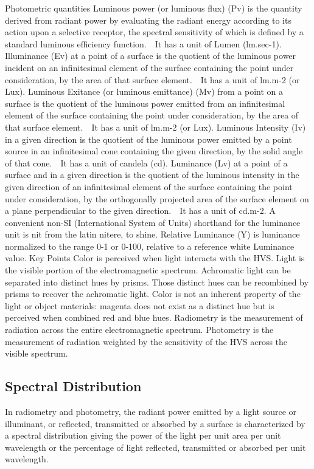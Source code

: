 Photometric quantities
Luminous power (or luminous flux) (Pv) is the quantity derived from radiant power by evaluating the radiant energy according to its action upon a selective receptor, the spectral sensitivity of which is defined by a standard luminous efficiency function.   It has a unit of Lumen (lm.sec-1).
Illuminance (Ev) at a point of a surface is the quotient of the luminous power incident on an infinitesimal element of the surface containing the point under consideration, by the area of that surface element.   It has a unit of lm.m-2 (or Lux).
Luminous Exitance (or luminous emittance) (Mv) from a point on a surface is the quotient of the luminous power emitted from an infinitesimal element of the surface containing the point under consideration, by the area of that surface element.   It has a unit of lm.m-2 (or Lux).
Luminous Intensity (Iv) in a given direction is the quotient of the luminous power emitted by a point source in an infinitesimal cone containing the given direction, by the solid angle of that cone.   It has a unit of candela (cd).
Luminance (Lv) at a point of a surface and in a given direction is the quotient of the luminous intensity in the given direction of an infinitesimal element of the surface containing the point under consideration, by the orthogonally projected area of the surface element on a plane perpendicular to the given direction.   It has a unit of cd.m-2. A convenient non-SI (International System of Units) shorthand for the luminance unit is nit from the latin nitere, to shine.
Relative Luminance (Y) is luminance normalized to the range 0-1 or 0-100, relative to a reference white Luminance value.
Key Points
Color is perceived when light interacts with the HVS.
Light is the visible portion of the electromagnetic spectrum.
Achromatic light can be separated into distinct hues by prisms. Those distinct hues can be recombined by prisms to recover the achromatic light.
Color is not an inherent property of the light or object materials:  magenta does not exist as a distinct hue but is perceived when combined red and blue hues.
Radiometry is the measurement of radiation across the entire electromagnetic spectrum.
Photometry is the measurement of radiation weighted by the sensitivity of the HVS across the visible spectrum.

\subsection{Spectral Distribution}

In radiometry and photometry, the radiant power emitted by a light source or illuminant, or reflected, transmitted or absorbed by a surface is characterized by a spectral distribution giving the power of the light per unit area per unit wavelength or the percentage of light reflected, transmitted or absorbed per unit wavelength.


